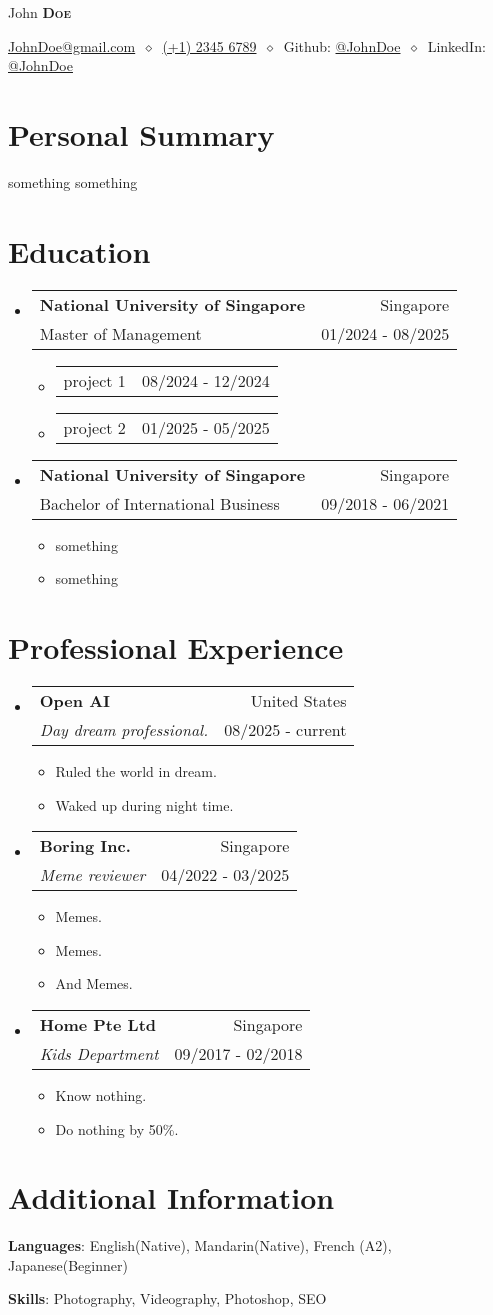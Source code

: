 \documentclass[a4paper,12pt]{article}
\makeatletter
\newcommand{\cvitem}[1]{
  \item\small{
    {#1\vspace{-2pt}}
  }
}
\newcommand{\cvheading}[4]{
  \vspace{-2pt}\item
    {\ContactFont
    \begin{tabular*}{\textwidth}[t]{l@{\extracolsep{\fill}}r}
      \textbf{#1} & #2 \\
      \small#3 & \small#4 \\
    \end{tabular*}}\vspace{-7pt}
}
\newcommand{\cvheadingstart}{\begin{itemize}[leftmargin=0in, label={}]}
\newcommand{\cvheadingend}{\end{itemize}}
\newcommand{\cvitemstart}{\begin{itemize}[label=\textopenbullet]\justifying}
\newcommand{\cvitemend}{\end{itemize}\vspace{-5pt}}
\newcommand{\cvskill}[2]{\textbf{#1}: #2\par}
\newcommand{\cvitemr}[2]{%
  \item\small
  \begin{tabularx}{\linewidth}{@{}X@{\hfill}r@{}}
    #1 & \small #2
  \end{tabularx}\vspace{-2pt}%
}
\makeatother
\begin{document}
\begin{center}
  {\fontsize{20}{24}\selectfont John \textbf{\textsc{Doe}}\par}
  \vspace{1pt}\small
  \href{mailto:JohnDoe@gmail.com}{JohnDoe@gmail.com}
  $\ \diamond\ $
  \href{tel:+123456789}{(+1) 2345 6789}
  $\ \diamond\ $
  Github: \href{https://www.Github.com/johndoe/}{@JohnDoe}
  $\ \diamond\ $
  LinkedIn: \href{https://www.linkedin.com/in/JohnDoe/}{@JohnDoe}
\end{center}

\section{Personal Summary}
something something

\section{Education}
\cvheadingstart
  \cvheading
    {National University of Singapore}{Singapore}
    {Master of Management}{01/2024 - 08/2025}
    \cvitemstart
      \cvitemr{project 1}{08/2024 - 12/2024}
      \cvitemr{project 2}{01/2025 - 05/2025}
    \cvitemend
  \cvheading
    {National University of Singapore}{Singapore}
    {Bachelor of International Business}{09/2018 - 06/2021}
    \cvitemstart
      \cvitem{something }
      \cvitem{something}
    \cvitemend
\cvheadingend

\section{Professional Experience}
\cvheadingstart

    \cvheading
    {Open AI}{United States}
    {\textit{Day dream professional.}}{08/2025 - current}
    \cvitemstart
      \cvitem{Ruled the world in dream.}
      \cvitem{Waked up during night time.}
    \cvitemend

    \cvheading
    {Boring Inc.}{Singapore}
    {\textit{Meme reviewer}}{04/2022 - 03/2025}
    \cvitemstart
        \cvitem{Memes.}
        \cvitem{Memes.}
        \cvitem{And Memes.}
    \cvitemend

    \cvheading
    {Home Pte Ltd}{Singapore}
    {\textit{Kids Department}}{09/2017 - 02/2018}
    \cvitemstart
        \cvitem{Know nothing.}
        \cvitem{Do nothing by 50\%.}
    \cvitemend
\cvheadingend

\section{Additional Information}
    \cvskill{Languages}{English(Native), Mandarin(Native), French (A2), Japanese(Beginner)}
    \cvskill{Skills}{Photography, Videography, Photoshop, SEO}

\vspace{-5pt}
\end{document}
